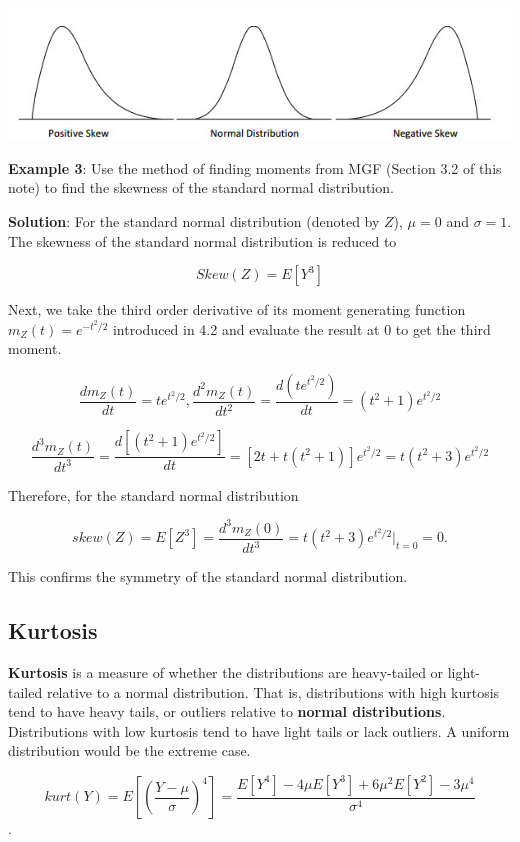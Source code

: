 \documentclass[
]{book}
\begin{document}
\begin{center}\includegraphics[width=0.7\linewidth]{topic05/skewness} \end{center}

\textbf{Example 3}: Use the method of finding moments from MGF (Section 3.2 of this note) to find the skewness of the standard normal distribution.

\textbf{Solution}: For the standard normal distribution (denoted by \(Z\)), \(\mu =0\) and \(\sigma =1\). The skewness of the standard normal distribution is reduced to

\[
Skew(Z) = E[Y^3]
\]

Next, we take the third order derivative of its moment generating function \(m_Z(t) = e^{-t^2/2}\) introduced in 4.2 and evaluate the result at 0 to get the third moment.

\[
\frac{d m_Z(t)}{dt} =te^{t^2/2},  \frac{d^2 m_Z(t)}{dt^2} =\frac{d(te^{t^2/2})}{dt}=(t^2+1)e^{t^2/2}
\]

\[
\frac{d^3 m_Z(t)}{dt^3} =\frac{d[(t^2+1)e^{t^2/2}]}{dt} = [2t+t(t^2+1)]e^{t^2/2} = t(t^2+3)e^{t^2/2}
\]

Therefore, for the standard normal distribution

\[
skew(Z) = E[Z^3] = \frac{d^3 m_Z(0)}{dt^3} = t(t^2+3)e^{t^2/2}|_{t = 0} = 0.
\]

This confirms the symmetry of the standard normal distribution.

\hypertarget{kurtosis}{%
\subsection{Kurtosis}\label{kurtosis}}

\textbf{Kurtosis} is a measure of whether the distributions are heavy-tailed or light-tailed relative to a normal distribution. That is, distributions with high kurtosis tend to have heavy tails, or outliers relative to \textbf{normal distributions}. Distributions with low kurtosis tend to have light tails or lack outliers. A uniform distribution would be the extreme case.

\[
kurt(Y) = E\left[ \left(\frac{Y-\mu}{\sigma}\right)^4\right]=\frac{E[Y^4]-4\mu E[Y^3] + 6\mu^2E[Y^2]-3\mu^4}{\sigma^4}
\].
\end{document}
